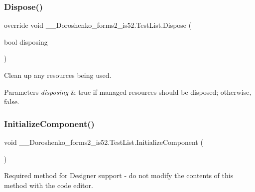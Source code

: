 \subsubsection{\texorpdfstring{Dispose()}{Dispose()}}
{\footnotesize\ttfamily override void \+\_\+\_\+\+Doroshenko\+\_\+forms2\+\_\+is52.\+Test\+List.\+Dispose (\begin{DoxyParamCaption}\item[{bool}]{disposing }\end{DoxyParamCaption})\hspace{0.3cm}{\ttfamily [protected]}}



Clean up any resources being used. 


\begin{DoxyParams}{Parameters}
{\em disposing} & true if managed resources should be disposed; otherwise, false.\\
\hline
\end{DoxyParams}
\hypertarget{class__7___doroshenko__forms2__is52_1_1_test_list_acd9cb03990000f83a3e86ceac040ff7f}{}\label{class__7___doroshenko__forms2__is52_1_1_test_list_acd9cb03990000f83a3e86ceac040ff7f} 
\subsubsection{\texorpdfstring{Initialize\+Component()}{InitializeComponent()}}
{\footnotesize\ttfamily void \+\_\+\_\+\+Doroshenko\+\_\+forms2\+\_\+is52.\+Test\+List.\+Initialize\+Component (\begin{DoxyParamCaption}{ }\end{DoxyParamCaption})\hspace{0.3cm}{\ttfamily [private]}}



Required method for Designer support -\/ do not modify the contents of this method with the code editor. 

